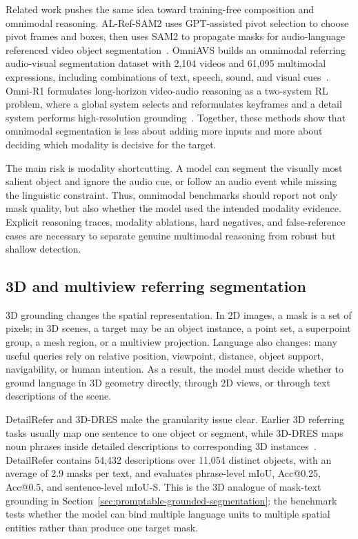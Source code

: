 Related work pushes the same idea toward training-free composition and omnimodal reasoning. AL-Ref-SAM2 uses GPT-assisted pivot selection to choose pivot frames and boxes, then uses SAM2 to propagate masks for audio-language referenced video object segmentation~\citep{huangUnleashingTemporalspatialReasoning2025}. OmniAVS builds an omnimodal referring audio-visual segmentation dataset with 2,104 videos and 61,095 multimodal expressions, including combinations of text, speech, sound, and visual cues~\citep{yingOmnimodalExpressionsReasoning2025}. Omni-R1 formulates long-horizon video-audio reasoning as a two-system RL problem, where a global system selects and reformulates keyframes and a detail system performs high-resolution grounding~\citep{zhongOmnir1ReinforcementLearning2026}. Together, these methods show that omnimodal segmentation is less about adding more inputs and more about deciding which modality is decisive for the target.

The main risk is modality shortcutting. A model can segment the visually most salient object and ignore the audio cue, or follow an audio event while missing the linguistic constraint. Thus, omnimodal benchmarks should report not only mask quality, but also whether the model used the intended modality evidence. Explicit reasoning traces, modality ablations, hard negatives, and false-reference cases are necessary to separate genuine multimodal reasoning from robust but shallow detection.

\subsection{3D and multiview referring segmentation}

3D grounding changes the spatial representation. In 2D images, a mask is a set of pixels; in 3D scenes, a target may be an object instance, a point set, a superpoint group, a mesh region, or a multiview projection. Language also changes: many useful queries rely on relative position, viewpoint, distance, object support, navigability, or human intention. As a result, the model must decide whether to ground language in 3D geometry directly, through 2D views, or through text descriptions of the scene.

DetailRefer and 3D-DRES make the granularity issue clear. Earlier 3D referring tasks usually map one sentence to one object or segment, while 3D-DRES maps noun phrases inside detailed descriptions to corresponding 3D instances~\citep{chen3DDRESDetailed3D2026}. DetailRefer contains 54,432 descriptions over 11,054 distinct objects, with an average of 2.9 masks per text, and evaluates phrase-level mIoU, Acc@0.25, Acc@0.5, and sentence-level mIoU-S. This is the 3D analogue of mask-text grounding in Section~\ref{sec:promptable-grounded-segmentation}: the benchmark tests whether the model can bind multiple language units to multiple spatial entities rather than produce one target mask.

